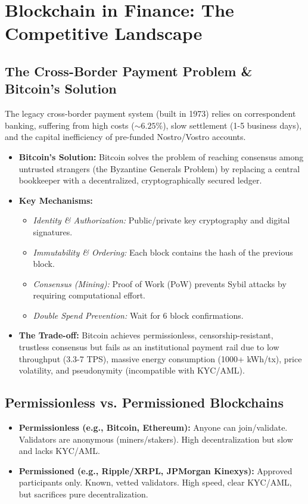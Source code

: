 \section{Blockchain in Finance: The Competitive Landscape}

\subsection{The Cross-Border Payment Problem \& Bitcoin's Solution}
The legacy cross-border payment system (built in 1973) relies on correspondent
banking, suffering from high costs ($\sim 6.25\%$), slow settlement (1-5
business days), and the capital inefficiency of pre-funded Nostro/Vostro
accounts.
\begin{itemize}
    \item \textbf{Bitcoin's Solution:} Bitcoin solves the problem of reaching consensus among
          untrusted strangers (the Byzantine Generals Problem) by replacing a central
          bookkeeper with a decentralized, cryptographically secured ledger.
    \item \textbf{Key Mechanisms:}
          \begin{itemize}
              \item \textit{Identity \& Authorization:} Public/private key cryptography and digital
                    signatures.
              \item \textit{Immutability \& Ordering:} Each block contains the hash of the previous block.
              \item \textit{Consensus (Mining):} Proof of Work (PoW) prevents Sybil attacks by requiring
                    computational effort.
              \item \textit{Double Spend Prevention:} Wait for 6 block confirmations.
          \end{itemize}
    \item \textbf{The Trade-off:} Bitcoin achieves permissionless, censorship-resistant,
          trustless consensus but fails as an institutional payment rail due to low
          throughput (3.3-7 TPS), massive energy consumption (1000+ kWh/tx), price
          volatility, and pseudonymity (incompatible with KYC/AML).
\end{itemize}

\subsection{Permissionless vs. Permissioned Blockchains}
\begin{itemize}
    \item \textbf{Permissionless (e.g., Bitcoin, Ethereum):} Anyone can join/validate. Validators
          are anonymous (miners/stakers). High decentralization but slow and lacks
          KYC/AML.
    \item \textbf{Permissioned (e.g., Ripple/XRPL, JPMorgan Kinexys):} Approved participants
          only. Known, vetted validators. High speed, clear KYC/AML, but sacrifices pure
          decentralization.
\end{itemize}

